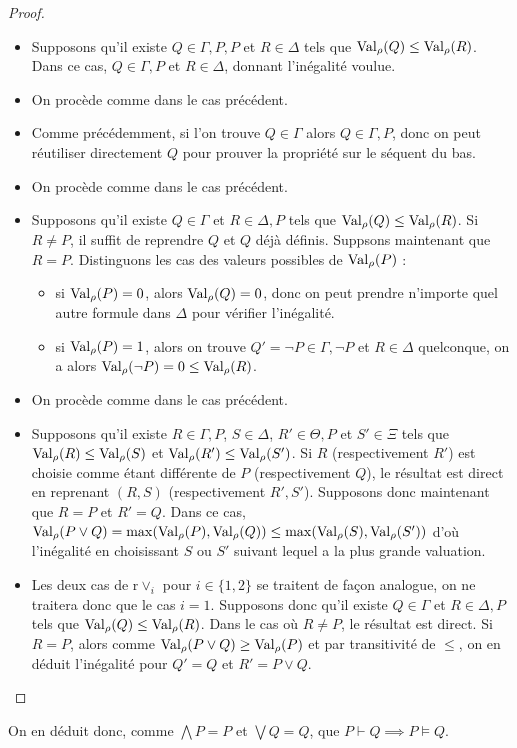 \begin{proof}
\begin{itemize}
  \item Supposons qu'il existe $Q\in\Gamma,P,P$ et $R\in\Delta$ tels que
    $\operatorname{Val}_\rho(Q)\leq\operatorname{Val}_\rho(R)$. Dans ce cas, $Q\in\Gamma,P$ et $R\in\Delta$,
    donnant l'inégalité voulue.
  \item On procède comme dans le cas précédent.
  \item Comme précédemment, si l'on trouve $Q\in\Gamma$ alors $Q\in\Gamma,P$,
    donc on peut réutiliser directement $Q$ pour prouver la propriété sur le
    séquent du bas.
  \item On procède comme dans le cas précédent.
  \item Supposons qu'il existe $Q\in\Gamma$ et $R\in\Delta,P$ tels que
    $\operatorname{Val}_\rho(Q)\leq\operatorname{Val}_\rho(R)$. Si $R \neq P$, il suffit de reprendre $Q$ et
    $Q$ déjà définis. Suppsons maintenant que $R = P$. Distinguons les cas des
    valeurs possibles de $\operatorname{Val}_\rho(P)$ :
    \begin{itemize}
    \item si $\operatorname{Val}_\rho(P) = 0$, alors $\operatorname{Val}_\rho(Q) = 0$, donc on peut prendre
      n'importe quel autre formule dans $\Delta$ pour vérifier l'inégalité.
    \item si $\operatorname{Val}_\rho(P) = 1$, alors on trouve
      $Q' = \lnot P \in \Gamma,\lnot P$ et $R\in \Delta$ quelconque, on a alors
      $\operatorname{Val}_\rho(\lnot P) = 0 \leq \operatorname{Val}_\rho(R)$.
    \end{itemize}
  \item On procède comme dans le cas précédent.
  \item Supposons qu'il existe $R\in\Gamma,P$, $S\in\Delta$, $R'\in\Theta,P$ et
    $S'\in\Xi$ tels que $\operatorname{Val}_\rho(R)\leq\operatorname{Val}_\rho(S)$ et
    $\operatorname{Val}_\rho(R')\leq\operatorname{Val}_\rho(S')$. Si $R$ (respectivement $R'$) est choisie
    comme étant différente de $P$ (respectivement $Q$), le résultat est direct
    en reprenant $(R,S)$ (respectivement $R',S'$). Supposons donc maintenant que
    $R = P$ et $R' = Q$. Dans ce cas,
    $\operatorname{Val}_\rho(P\lor Q) = \max(\operatorname{Val}_\rho(P),\operatorname{Val}_\rho(Q)) \leq \max(\operatorname{Val}_\rho(S),
    \operatorname{Val}_\rho(S'))$ d'où l'inégalité en choisissant $S$ ou $S'$ suivant lequel
    a la plus grande valuation.
  \item Les deux cas de $\mathrm r\lor_i$ pour $i\in\{1,2\}$ se traitent de façon
    analogue, on ne traitera donc que le cas $i = 1$. Supposons donc qu'il existe
    $Q\in\Gamma$ et $R\in\Delta,P$ tels que $\operatorname{Val}_\rho(Q)\leq\operatorname{Val}_\rho(R)$. Dans
    le cas où $R\neq P$, le résultat est direct. Si $R = P$, alors comme
    $\operatorname{Val}_\rho(P\lor Q) \geq \operatorname{Val}_\rho(P)$ et par transitivité de $\leq$, on en
    déduit l'inégalité pour $Q' = Q$ et $R' = P\lor Q$.
  \end{itemize}
\end{proof}

On en déduit donc, comme $\bigwedge P = P$ et $\bigvee Q = Q$, que
$P\vdash Q \implies P \vDash Q$.
